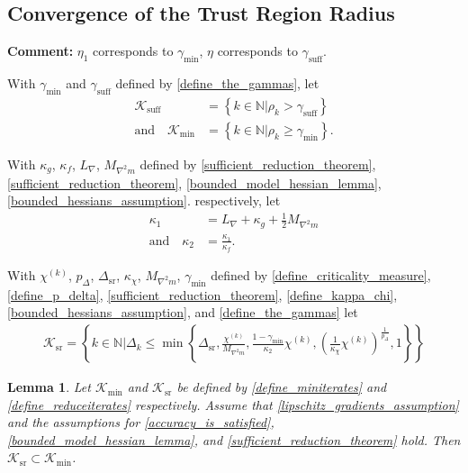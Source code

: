 \documentclass{article}
\newenvironment{comment}
  {\par\medskip
   \color{red}%
   \begin{framed}
   \textbf{Comment: }\ignorespaces}
 {\end{framed}
  \medskip}
\newtheorem{lemma}[theorem]{Lemma}
\theoremstyle{case}
\numberwithin{theorem}{subsection}
\newcommand{\chik}{{\chi^{(k)}}}
\newcommand{\dk}{\Delta_k}
\newcommand{\dsr}{{\Delta_{\textrm{sr}}}}
\newcommand{\gammabi}{\gamma_{\textrm{suff}}}
\newcommand{\gammasm}{\gamma_{\textrm{min}}}
\newcommand{\lipgrad}{{L_{\nabla}}}
\newcommand{\maxmodelhessian}{{M_{\nabla^2 m}}}
\newcommand{\naturals}{\mathbb N}
\newcommand{\rk}{\rho_k}
\newcommand{\suffiterates}{{\mathcal K_{\textrm{suff}}}}
\newcommand{\miniterates}{{\mathcal K_{\textrm{min}}}}
\newcommand{\reduceiterates}{{\mathcal K_{\textrm{sr}}}}
\newcommand{\theircnot}{{\kappa_1}}
\newcommand{\theirc}{{\kappa_2}}
\begin{document}
\subsection{Convergence of the Trust Region Radius}

\begin{comment}
$\eta_1$ corresponds to $\gammasm$, $\eta$ corresponds to $\gammabi$.
\end{comment}


With 
$\gammasm$ and $\gammabi$
defined by \cref{define_the_gammas},
let
\begin{align}
\suffiterates &= \left\{k \in \naturals | \rk > \gammabi \right\} \label{define_suffiterates} \\
\textrm{and} \quad \miniterates &= \left\{k \in \naturals | \rk \ge \gammasm \right\} \label{define_miniterates}.
\end{align}

With
$\kappa_g$, $\kappa_f$, $\lipgrad$, $\maxmodelhessian$
defined by
\cref{sufficient_reduction_theorem}, \cref{sufficient_reduction_theorem}, \cref{bounded_model_hessian_lemma}, \cref{bounded_hessians_assumption}.
respectively, let
\begin{align}
\theircnot &= \lipgrad + \kappa_{g} + \frac 1 2 \maxmodelhessian \label{define_theircnot} \\
\textrm{and} \quad \theirc &= \frac{\theircnot}{\kappa_f} .  \label{define_theirc}
\end{align}

With
$\chik$, $p_{\Delta}$, $\dsr$, $\kappa_{\chi}$, $\maxmodelhessian$, $\gammasm$
defined by 
\cref{define_criticality_measure}, \cref{define_p_delta}, \cref{sufficient_reduction_theorem}, \cref{define_kappa_chi}, \cref{bounded_hessians_assumption}, and \cref{define_the_gammas}
let
\begin{align}
\label{define_reduceiterates}
\reduceiterates = \left \{ k \in \naturals \bigg| \dk \le \min \left\{ 
\dsr, 
\frac {\chik}{\maxmodelhessian}, 
\frac{1-\gammasm}{\theirc}\chik,
\left(\frac 1 {\kappa_{\chi}}  \chik\right)^{\frac 1 {p_{\Delta}}}, 
1
\right\} \right \} 
\end{align}


\begin{lemma}
\label{mathcal_k_subset_bar_s}
Let $\miniterates$ and $\reduceiterates$ be defined by \cref{define_miniterates} and \cref{define_reduceiterates} respectively.
Assume that 
\cref{lipschitz_gradients_assumption}
and the assumptions for
\cref{accuracy_is_satisfied},
\cref{bounded_model_hessian_lemma},
and \cref{sufficient_reduction_theorem}
hold.
Then $\reduceiterates \subset \miniterates$.
\end{lemma}
 
\end{document}
